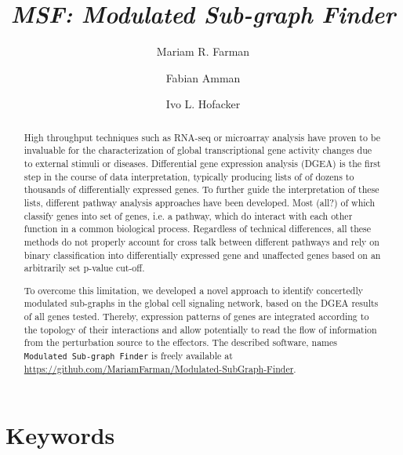 \documentclass[10pt,a4paper,twocolumn]{article}
\newcommand{\TODO}[1]{\begingroup\color{red}#1\endgroup}
\begin{document}
\title{\textit{MSF: Modulated Sub-graph Finder} }

\author[1]{Mariam R. Farman}
\author[1,2]{Fabian Amman}
\author[1]{Ivo L. Hofacker}



\maketitle
\thispagestyle{fancy}

\begin{abstract}

High throughput techniques such as RNA-seq or microarray analysis have
proven to be invaluable for the characterization of global
transcriptional gene activity changes due to external stimuli or
diseases. Differential gene expression analysis (DGEA) is the first
step in the course of data interpretation, typically producing lists
of of dozens to thousands of differentially expressed genes. To
further guide the interpretation of these lists, different pathway
analysis approaches have been developed. Most (\TODO{all?}) of which
classify genes into set of genes, i.e. a pathway, which do interact
with each other function in a common biological process. Regardless of
technical differences, all these methods do not properly account for
cross talk between different pathways and rely on binary
classification into differentially expressed gene and unaffected genes
based on an arbitrarily set p-value cut-off.

To overcome this limitation, we developed a novel approach to identify
concertedly modulated sub-graphs in the global cell signaling network,
based on the DGEA results of all genes tested. Thereby, expression
patterns of genes are integrated according to the topology of their
interactions and allow potentially to read the flow of information
from the perturbation source to the effectors. The described software,
names \texttt{Modulated Sub-graph Finder} is freely available at
\url{https://github.com/MariamFarman/Modulated-SubGraph-Finder}.

\end{abstract}

\section*{Keywords}
\end{document}
